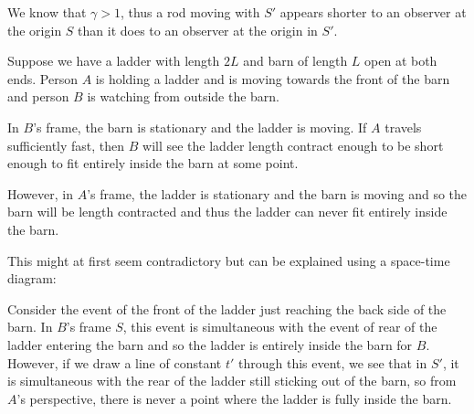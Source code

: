 \documentclass[../main.tex]{subfiles}
\begin{document}
We know that $\gamma > 1$, thus a rod moving with $S'$ appears shorter to an observer at the origin $S$ than it does to an observer at the origin in $S'$.
\begin{example}
  Suppose we have a ladder with length $2L$ and barn of length $L$ open at both ends.
  Person $A$ is holding a ladder and is moving towards the front of the barn and person $B$ is watching from outside the barn.

  In $B$'s frame, the barn is stationary and the ladder is moving.
  If $A$ travels sufficiently fast, then $B$ will see the ladder length contract enough to be short enough to fit entirely inside the barn at some point.

  However, in $A$'s frame, the ladder is stationary and the barn is moving and so the barn will be length contracted and thus the ladder can never fit entirely inside the barn.

  This might at first seem contradictory but can be explained using a space-time diagram:
  \begin{center}
  \end{center}
  Consider the event of the front of the ladder just reaching the back side of the barn.
  In $B$'s frame $S$, this event is simultaneous with the event of rear of the ladder entering the barn and so the ladder is entirely inside the barn for $B$.
  However, if we draw a line of constant $t'$ through this event, we see that in $S'$, it is simultaneous with the rear of the ladder still sticking out of the barn, so from $A$'s perspective, there is never a point where the ladder is fully inside the barn.
\end{example}
\end{document}
